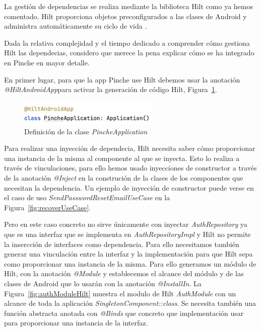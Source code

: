 La gestión de dependencias se realiza mediante la biblioteca Hilt como ya hemos comentado. Hilt proporciona objetos preconfigurados a las clases de Android y administra automáticamente su ciclo de vida \cite{hilt}.

Dada la relativa complejidad y el tiempo dedicado a comprender cómo gestiona Hilt las dependecias, considero que merece la pena explicar cómo se ha integrado en Pinche en mayor detalle.

En primer lugar, para que la app Pinche use Hilt debemos usar la anotación \textit{@HiltAndroidApp}para activar la generación de código Hilt, Figura~\ref{fig:pincheAppHilt}.

\begin{figure}[H]
\centering
\includegraphics[width=0.6\textwidth]{./img/description/pinche_app_hilt.png}
\caption{Definición de la clase \textit{PincheApplication}}
\label{fig:pincheAppHilt}
\end{figure}

Para realizar una inyección de dependecia, Hilt necesita saber cómo proporcionar una instancia de la misma al componente al que se inyecta. Esto lo realiza a través de vinculaciones, para ello hemos usado inyecciones de constructor a través de la anotación \textit{@Inject} en la construción de la clases de los componentes que necesitan la dependencia. Un ejemplo de inyección de constructor puede verse en el caso de uso \textit{SendPasswordResetEmailUseCase} en la Figura~\ref{fig:recoverUseCase}.

Pero en este caso concreto no sirve únicamente con inyectar \textit{AuthRepository} ya que es una interfaz que se implementa en \textit{AuthRepositoryImpl} y Hilt no permite la insercción de interfaces como dependencia. Para ello necesitamos también generar una vinculación entre la interfaz y la implementación para que Hilt sepa como proporcionar una instancia de la misma. Para ello generamos un módulo de Hilt, con la anotación \textit{@Module} y establecemos el alcance del módulo y de las clases de Android que lo usarán con la anotación \textit{@InstallIn}. La Figura~\ref{fig:authModuleHilt} muestra el modulo de Hilt \textit{AuthModule} con un alcance de toda la aplicación \textit{SingletonComponent::class}. Se necesita también una función abstracta anotada con \textit{@Binds} que concreto que implementación usar para proporcionar una instancia de la interfaz.

